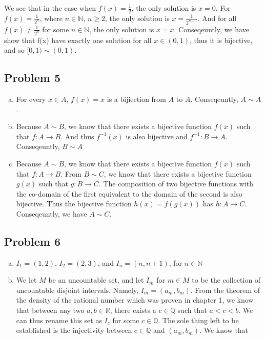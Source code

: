 \documentclass[12pt]{article}
\begin{document}
\begin{enumerate}[a).]
{        We see that in the case when $f(x) = \frac{1}{2}$, the only solution is $x = 0$.
        For $f(x) = \frac{1}{2^n}$, where $n \in \mathbb{N}$, $n \ge 2$, the only solution is $x = \frac{1}{2^{n-1}}$. 
        And for all $ f(x) \ne \frac{1}{2^n}$ for some $n \in \mathbb{N}$, the only solution is $x = x$. 
        Conseqeuntly, we have show that f(x) have exactly one solution for all $x \in (0,1)$, thus it is bijective, and so $[0,1) \sim (0,1)$. 
    }

\end{enumerate}


\subsection*{Problem 5}
\begin{enumerate}[a).]
    \item {
        For every $x \in A$, $f(x) = x$ is a bijiection from $A$ to $A$. 
        Conseqeuntly, $A \sim A$. 
    }
    \item {
        Because $A \sim B$, we know that there exists a bijective function $f(x)$ such that $f: A \rightarrow B$. 
        And thus $f^{-1}(x)$ is also bijective and $f^{-1}: B \rightarrow A$. 
        Conseqeuntly, $B \sim A$
    }
    \item {
        Because $A \sim B$, we know that there exists a bijective function $f(x)$ such that $f: A \rightarrow B$. 
        From $B \sim C$, we know that there exists a bijective function $g(x)$ such that $g: B \rightarrow C$. 
        The composition of two bijective functions with the co-domain of the first equivalent to the domain of the second is also bijective. 
        Thus the bijective function $h(x) = f(g(x))$ has $h: A \rightarrow C$. Conseqeuntly, we have $A \sim C$. 

    }
\end{enumerate}


\subsection*{Problem 6}
\begin{enumerate}[a).]
    \item {
    $I_1 = (1, 2)$,
    $I_2 = (2, 3)$,
    and $I_n = (n, n+1)$, for $n \in \mathbb{N}$

    }
    \item {
        We let $M$ be an uncountable set, and let $I_m$ for $m \in M$ to be the collection of uncountable disjoint intervals.
        Namely, $I_m = (a_m, b_m)$. From the theorem of the density of the rational number which was proven in chapter 1, we know that between any two $a,b \in \mathbb{R}$, there exists a $c \in \mathbb{Q}$ such that $a < c < b$. 
        We can thus rename this set as $I_c$ for some $c \in \mathbb{Q}$. 
        The sole thing left to be established is the injectivity between $c \in \mathbb{Q}$ and $(a_m, b_m)$. 
        We know that 

    }
\end{enumerate}
\end{document}
